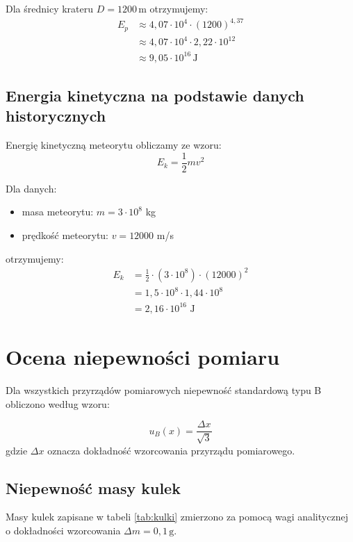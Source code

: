 \documentclass[a4paper,12pt]{article}
\begin{document}
Dla średnicy krateru \( D = 1200 \, \text{m} \) otrzymujemy:
\begin{align*}
    E_p & \approx 4,07 \cdot 10^4 \cdot (1200)^{4,37}      \\
        & \approx 4,07 \cdot 10^4 \cdot 2,22 \cdot 10^{12} \\
        & \approx 9,05 \cdot 10^{16} \, \text{J}
\end{align*}

\subsection{Energia kinetyczna na podstawie danych historycznych}

Energię kinetyczną meteorytu obliczamy ze wzoru:
\[
    E_k = \frac{1}{2} m v^2
\]

Dla danych:
\begin{itemize}
    \item masa meteorytu: \( m = 3 \cdot 10^8 \) kg
    \item prędkość meteorytu: \( v = 12000 \) m/s
\end{itemize}

otrzymujemy:
\begin{align*}
    E_k & = \frac{1}{2} \cdot (3 \cdot 10^8) \cdot (12000)^2 \\
        & = 1,5 \cdot 10^8 \cdot 1,44 \cdot 10^8             \\
        & = 2,16 \cdot 10^{16} \text{ J}
\end{align*}

\section{Ocena niepewności pomiaru}

Dla wszystkich przyrządów pomiarowych niepewność standardową typu B obliczono według wzoru:

\begin{equation}
    \label{eq:unc_B}
    u_B(x) = \frac{\Delta x}{\sqrt{3}}
\end{equation}
gdzie $\Delta x$ oznacza dokładność wzorcowania przyrządu pomiarowego.

\subsection{Niepewność masy kulek}
Masy kulek zapisane w tabeli \ref{tab:kulki} zmierzono za pomocą wagi analitycznej o dokładności wzorcowania $\Delta m = 0,1 \, \text{g}$.
\end{document}
